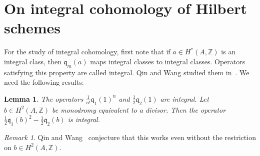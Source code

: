 \documentclass{alggeom}
\renewcommand{\rho}{\varrho}
\newcommand{\vac}{|0\rangle}
\newcommand{\G}{\mathfrak{G}}
\newcommand{\q}{\mathfrak{q}}
\newcommand{\defIs}{\vcentcolon=}
\newcommand{\Q}{\mathbb{Q}}
\newcommand{\Z}{\mathbb{Z}}
\theoremstyle{plain}
\newtheorem{lemma}[theorem]{Lemma}
\theoremstyle{definition}
\theoremstyle{remark}
\newtheorem{remark}[theorem]{Remark}
\begin{document}


\section{On integral cohomology of Hilbert schemes}\label{basisHilb2}

For the study of integral cohomology, first note that if $a \in H^*(A,\Z)$ is an integral class, then $\q_{m}(a) $ maps integral classes to integral classes. Operators satisfying this property are called integral. Qin and Wang studied them in~\cite{QinWang}. We need the following results:

\begin{lemma} \cite[Lem.~3.3, 3.6 and Thm.~4.5]{QinWang}\label{IntegralOperators}
The operators $\frac{1}{n!}\q_1(1)^n$ and $\frac{1}{2}\q_2(1) $ are integral.
Let $b\in H^2(A,\Z)$ be monodromy equivalent to a divisor. Then the operator $\frac{1}{2}\q_1(b)^2 - \frac{1}{2}\q_2(b)$ is integral. 
\end{lemma}
\begin{remark}
Qin and Wang~\cite[Thm. 1.1 et seq.]{QinWang} conjecture that this works even without the restriction on $b\in H^2(A,\Z)$. 
\end{remark}
\end{document}
